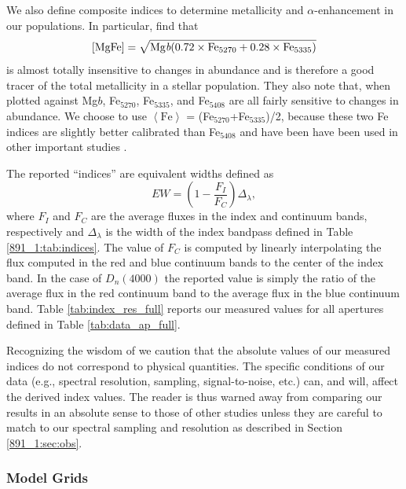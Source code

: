 We also define composite indices to determine metallicity and
$\alpha$-enhancement in our populations. In particular,
\citet{Thomas03} find that 
\begin{equation}
\mathrm{[MgFe]} = \sqrt{\mathrm{Mg
    \emph{b}}(0.72\times\mathrm{Fe}_{5270} +
  0.28\times\mathrm{Fe}_{5335})}
\end{equation}
is almost totally insensitive to changes in abundance and is therefore
a good tracer of the total metallicity in a stellar population. They
also note that, when plotted against Mg$b$, Fe$_{5270}$, Fe$_{5335}$,
and Fe$_{5408}$ are all fairly sensitive to changes in abundance. We
choose to use $\left<\mathrm{Fe}\right>$ =
(Fe$_{5270}$+Fe$_{5335}$)/2, because these two Fe indices are slightly
better calibrated than Fe$_{5408}$ \citep{Thomas03} and have been have
been used in other important studies
\citep[e.g.,][]{Trager05,Trager08,Trager09}.

The reported ``indices'' are equivalent widths defined as
\begin{equation}
  EW = \left(1 - \frac{F_I}{F_C}\right)\Delta_{\lambda},
\end{equation}
where $F_I$ and $F_C$ are the average fluxes in the index and
continuum bands, respectively and $\Delta_{\lambda}$ is the width of
the index bandpass defined in Table \ref{891_1:tab:indices}. The value of
$F_C$ is computed by linearly interpolating the flux computed in the
red and blue continuum bands to the center of the index band. In the
case of $D_n(4000)$ the reported value is simply the ratio of the
average flux in the red continuum band to the average flux in the blue
continuum band. Table \ref{tab:index_res_full} reports our measured values
for all apertures defined in Table \ref{tab:data_ap_full}.

Recognizing the wisdom of \citet{Balogh99} we caution that the
absolute values of our measured indices do not correspond to physical
quantities. The specific conditions of our data (e.g., spectral
resolution, sampling, signal-to-noise, etc.) can, and will, affect the
derived index values. The reader is thus warned away from comparing
our results in an absolute sense to those of other studies unless they
are careful to match to our spectral sampling and resolution as
described in Section \ref{891_1:sec:obs}.
% 

\subsubsection{Model Grids}
\label{891_1:sec:fidgrid}


